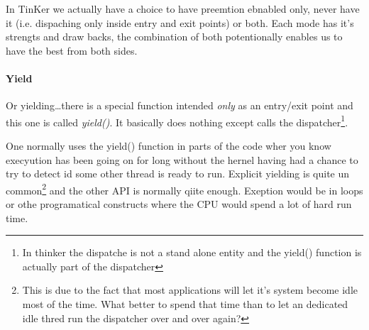 		In TinKer we actually have a choice to have preemtion ebnabled only, never have it (i.e. dispaching only inside entry and exit points) or both. Each mode has it's strengts and draw backs, the combination of both potentionally enables us to have the best from both sides.

		\paragraph{Yield} Or yielding\ldots there is a special function intended \textit{only} as an entry/exit point and this one is called \textit{yield()}. It basically does nothing except calls the dispatcher\footnote{In thinker the dispatche is not a stand alone entity and the yield() function is actually part of the dispatcher}. 

		One normally uses the yield() function in parts of the code wher you know execyution has been going on for long without the hernel having had a chance to try to detect id some other thread is ready to run. Explicit yielding is quite un common\footnote{This is due to the fact that most applications will let it's system become idle most of the time. What better to spend that time than to let an dedicated idle thred run the dispatcher over and over again?} and the other API is normally qiite enough. Exeption would be in loops or othe programatical constructs where the CPU would spend a lot of hard run time.

		

		
